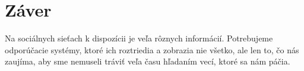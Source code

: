\documentclass[10pt,twoside,slovak,a4paper]{article}
\begin{document}
\section{Záver} \label{zaver}

Na sociálnych sieťach k dispozícii je veľa rôznych informácií. Potrebujeme odporúčacie systémy, ktoré ich roztriedia a zobrazia nie všetko, ale len to, čo nás zaujíma, aby sme nemuseli tráviť veľa času hľadaním vecí, ktoré sa nám páčia.




\end{document}
